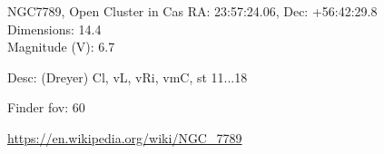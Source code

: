 \begin{block}{NGC7789, Open Cluster in Cas}
    RA: 23:57:24.06, Dec: +56:42:29.8 \\ 
    Dimensions: 14.4 \\ 
    Magnitude (V): 6.7


    Desc: (Dreyer) Cl, vL, vRi, vmC, st 11...18 

    Finder fov: 60 

    \url{https://en.wikipedia.org/wiki/NGC_7789} 
\end{block}